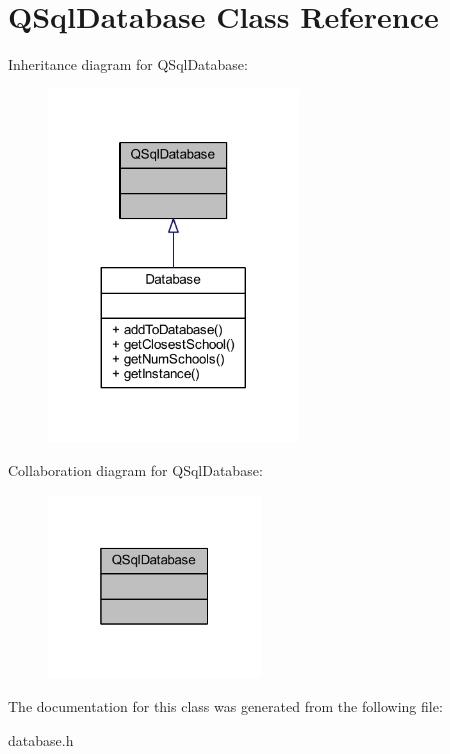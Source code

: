 \hypertarget{class_q_sql_database}{}\section{Q\+Sql\+Database Class Reference}
\label{class_q_sql_database}


Inheritance diagram for Q\+Sql\+Database\+:\nopagebreak
\begin{figure}[H]
\begin{center}
\leavevmode
\includegraphics[width=188pt]{class_q_sql_database__inherit__graph}
\end{center}
\end{figure}


Collaboration diagram for Q\+Sql\+Database\+:\nopagebreak
\begin{figure}[H]
\begin{center}
\leavevmode
\includegraphics[width=160pt]{class_q_sql_database__coll__graph}
\end{center}
\end{figure}


The documentation for this class was generated from the following file\+:\begin{DoxyCompactItemize}
\item 
database.\+h\end{DoxyCompactItemize}
